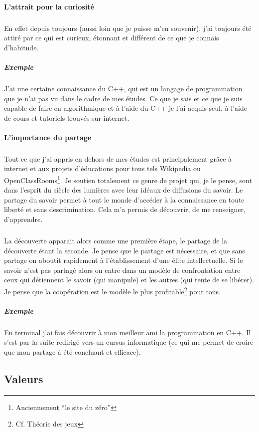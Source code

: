 \documentclass[a4paper,12pt, draft]{report}
\begin{document}
\paragraph{L'attrait pour la curiosité}
\subparagraph{}
En effet depuis toujours (aussi loin que je puisse m'en souvenir), j'ai toujours été attiré par ce qui est curieux, étonnant et différent de ce que je connais d'habitude.
\subparagraph{Exemple}
J'ai une certaine connaissance du C++, qui est un langage de programmation que je n'ai pas vu dans le cadre de mes études.  Ce que je sais et ce que je suis capable de faire en algorithmique et à l'aide du C++ je l'ai acquis seul, à l'aide de cours et tutoriels trouvés sur internet. 

 

\paragraph{L'importance du partage}
\subparagraph{}
Tout ce que j'ai appris en dehors de mes études est principalement grâce à internet et aux projets d'éducations pour tous tels Wikipedia ou OpenClassRooms\footnote{Anciennement ``le site du zéro''}.
Je soutien totalement ce genre de projet qui, je le pense, sont dans l'esprit du siècle des lumières avec leur idéaux de diffusions du savoir. Le partage du savoir permet à tout le monde d'accéder à la connaissance en toute liberté et sans descrimination. Cela m'a permis de découvrir, de me renseigner, d'apprendre. 

\subparagraph{}
La découverte apparait alors comme une première étape, le partage de la découverte étant la seconde. Je pense que le partage est nécessaire, et que sans partage on aboutit rapidement  à l'établissement d'une élite intellectuelle. Si le savoir n'est pas partagé alors on entre dans un modèle de confrontation entre ceux qui détiennent le savoir (qui manipule) et les autres (qui tente de se libérer). Je pense que la coopération est le modèle le plus profitable\footnote{Cf. Théorie des jeux} pour tous.

\subparagraph{Exemple} En terminal j'ai fais découvrir à mon meilleur ami la programmation en C++. Il s'est par la suite redirigé vers un cursus informatique (ce qui me permet de croire que mon partage à été concluant et efficace).




\subsection{Valeurs}
\end{document}
